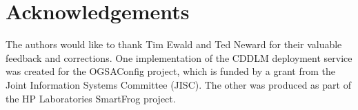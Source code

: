 \section{Acknowledgements}
The authors would like to thank Tim Ewald and Ted Neward for their
valuable feedback and corrections. One implementation of the CDDLM 
deployment service was
created for the OGSAConfig project, which is funded by a grant from
the Joint Information Systems Committee (JISC). The other was produced
as part of the HP Laboratories SmartFrog project. 
